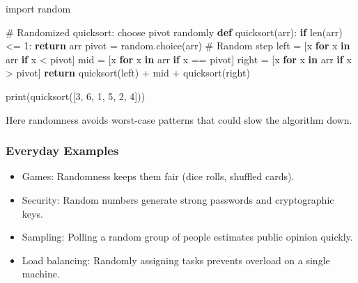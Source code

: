 \documentclass[
  letterpaper,
  DIV=11,
  numbers=noendperiod]{scrreprt}
\newenvironment{Shaded}{\begin{snugshade}}{\end{snugshade}}
\newcommand{\BuiltInTok}[1]{\textcolor[rgb]{0.00,0.23,0.31}{#1}}
\newcommand{\CommentTok}[1]{\textcolor[rgb]{0.37,0.37,0.37}{#1}}
\newcommand{\ControlFlowTok}[1]{\textcolor[rgb]{0.00,0.23,0.31}{\textbf{#1}}}
\newcommand{\DecValTok}[1]{\textcolor[rgb]{0.68,0.00,0.00}{#1}}
\newcommand{\ImportTok}[1]{\textcolor[rgb]{0.00,0.46,0.62}{#1}}
\newcommand{\KeywordTok}[1]{\textcolor[rgb]{0.00,0.23,0.31}{\textbf{#1}}}
\newcommand{\NormalTok}[1]{\textcolor[rgb]{0.00,0.23,0.31}{#1}}
\newcommand{\OperatorTok}[1]{\textcolor[rgb]{0.37,0.37,0.37}{#1}}
\providecommand{\tightlist}{%
  \setlength{\itemsep}{0pt}\setlength{\parskip}{0pt}}
\begin{document}
\begin{Shaded}
\begin{Highlighting}[]
\ImportTok{import}\NormalTok{ random}

\CommentTok{\# Randomized quicksort: choose pivot randomly}
\KeywordTok{def}\NormalTok{ quicksort(arr):}
    \ControlFlowTok{if} \BuiltInTok{len}\NormalTok{(arr) }\OperatorTok{\textless{}=} \DecValTok{1}\NormalTok{:}
        \ControlFlowTok{return}\NormalTok{ arr}
\NormalTok{    pivot }\OperatorTok{=}\NormalTok{ random.choice(arr)       }\CommentTok{\# Random step}
\NormalTok{    left  }\OperatorTok{=}\NormalTok{ [x }\ControlFlowTok{for}\NormalTok{ x }\KeywordTok{in}\NormalTok{ arr }\ControlFlowTok{if}\NormalTok{ x }\OperatorTok{\textless{}}\NormalTok{ pivot]}
\NormalTok{    mid   }\OperatorTok{=}\NormalTok{ [x }\ControlFlowTok{for}\NormalTok{ x }\KeywordTok{in}\NormalTok{ arr }\ControlFlowTok{if}\NormalTok{ x }\OperatorTok{==}\NormalTok{ pivot]}
\NormalTok{    right }\OperatorTok{=}\NormalTok{ [x }\ControlFlowTok{for}\NormalTok{ x }\KeywordTok{in}\NormalTok{ arr }\ControlFlowTok{if}\NormalTok{ x }\OperatorTok{\textgreater{}}\NormalTok{ pivot]}
    \ControlFlowTok{return}\NormalTok{ quicksort(left) }\OperatorTok{+}\NormalTok{ mid }\OperatorTok{+}\NormalTok{ quicksort(right)}

\BuiltInTok{print}\NormalTok{(quicksort([}\DecValTok{3}\NormalTok{, }\DecValTok{6}\NormalTok{, }\DecValTok{1}\NormalTok{, }\DecValTok{5}\NormalTok{, }\DecValTok{2}\NormalTok{, }\DecValTok{4}\NormalTok{]))}
\end{Highlighting}
\end{Shaded}

Here randomness avoids worst-case patterns that could slow the algorithm
down.

\subsubsection{Everyday Examples}\label{everyday-examples-23}

\begin{itemize}
\tightlist
\item
  Games: Randomness keeps them fair (dice rolls, shuffled cards).
\item
  Security: Random numbers generate strong passwords and cryptographic
  keys.
\item
  Sampling: Polling a random group of people estimates public opinion
  quickly.
\item
  Load balancing: Randomly assigning tasks prevents overload on a single
  machine.
\end{itemize}
\end{document}
